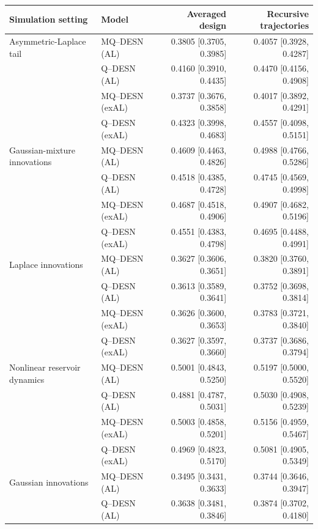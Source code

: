 \begin{table}[p]
\centering
\footnotesize
\setlength{\tabcolsep}{3pt}
\renewcommand{\arraystretch}{1.08}
\begin{tabular}{@{}>{\raggedright\arraybackslash}p{}lrr@{}}
\toprule
Simulation setting & Model & Averaged design & Recursive trajectories \\
\midrule
Asymmetric-Laplace tail & MQ--DESN (AL) & 0.3805 [0.3705, 0.3985] & 0.4057 [0.3928, 0.4287] \\
 & Q--DESN (AL) & 0.4160 [0.3910, 0.4435] & 0.4470 [0.4156, 0.4908] \\
 & MQ--DESN (exAL) & 0.3737 [0.3676, 0.3858] & 0.4017 [0.3892, 0.4291] \\
 & Q--DESN (exAL) & 0.4323 [0.3998, 0.4683] & 0.4557 [0.4098, 0.5151] \\
\addlinespace[2pt]
Gaussian-mixture innovations & MQ--DESN (AL) & 0.4609 [0.4463, 0.4826] & 0.4988 [0.4766, 0.5286] \\
 & Q--DESN (AL) & 0.4518 [0.4385, 0.4728] & 0.4745 [0.4569, 0.4998] \\
 & MQ--DESN (exAL) & 0.4687 [0.4518, 0.4906] & 0.4907 [0.4682, 0.5196] \\
 & Q--DESN (exAL) & 0.4551 [0.4383, 0.4798] & 0.4695 [0.4488, 0.4991] \\
\addlinespace[2pt]
Laplace innovations & MQ--DESN (AL) & 0.3627 [0.3606, 0.3651] & 0.3820 [0.3760, 0.3891] \\
 & Q--DESN (AL) & 0.3613 [0.3589, 0.3641] & 0.3752 [0.3698, 0.3814] \\
 & MQ--DESN (exAL) & 0.3626 [0.3600, 0.3653] & 0.3783 [0.3721, 0.3840] \\
 & Q--DESN (exAL) & 0.3627 [0.3597, 0.3660] & 0.3737 [0.3686, 0.3794] \\
\addlinespace[2pt]
Nonlinear reservoir dynamics & MQ--DESN (AL) & 0.5001 [0.4843, 0.5250] & 0.5197 [0.5000, 0.5520] \\
 & Q--DESN (AL) & 0.4881 [0.4787, 0.5031] & 0.5030 [0.4908, 0.5239] \\
 & MQ--DESN (exAL) & 0.5003 [0.4858, 0.5201] & 0.5156 [0.4959, 0.5467] \\
 & Q--DESN (exAL) & 0.4969 [0.4823, 0.5170] & 0.5081 [0.4905, 0.5349] \\
\addlinespace[2pt]
Gaussian innovations & MQ--DESN (AL) & 0.3495 [0.3431, 0.3633] & 0.3744 [0.3646, 0.3947] \\
 & Q--DESN (AL) & 0.3638 [0.3481, 0.3846] & 0.3874 [0.3702, 0.4180] \\

\end{tabular}
\end{table}
